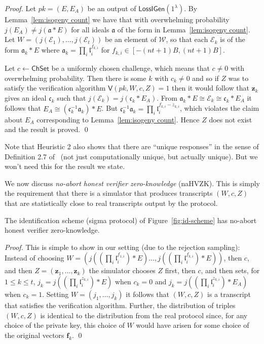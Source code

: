 \documentclass{llncs}
\newcommand{\E}{\mathcal{E}}
\renewcommand{\a}{\mathfrak{a}}
\renewcommand{\c}{\mathfrak{c}}
\renewcommand{\l}{\mathfrak{l}}
\newcommand{\f}{\mathbf{f}}
\newcommand{\z}{\mathbf{z}}
\newcommand{\VV}{\mathsf{V}}
\newcommand{\Wset}{\mathcal{W}}
\newcommand{\ChSet}{\textsf{ChSet}}
\newcommand{\LossIGen}{\mathsf{LossIGen}}
\begin{document}
\begin{proof}
Let $pk = (E, E_A )$ be an output of $\LossIGen( 1^\lambda )$.
By Lemma~\ref{lem:isogeny count} we have that with overwhelming probability $j(E_A) \ne j( \a * E )$ for all ideals $\a$ of the form in Lemma~\ref{lem:isogeny count}.
Let $W = (j(\E_1), \dots, j(\E_t) )$ be an element of $\Wset$, so that each $\E_k$ is of the form $\a_k * E$ where $\a_k = \prod_i \l_i^{f_{k,i}}$ for $f_{k,i} \in [-(nt+1)B, (nt+1)B ]$.


Let $c \leftarrow \ChSet$ be a uniformly chosen challenge, which means that $c \ne 0$ with overwhelming probability.
Then there is some $k$ with $c_k \ne 0$ and so if $Z$ was to satisfy the verification algorithm
$\VV( pk, W, c, Z ) = 1$ then it would follow that $\z_k$ gives an ideal $\c_k$ such that $j(\E_k) = j( \c_k * E_A )$.
From $\a_k * E  \cong \E_k \cong \c_k * E_A$ it follows that $E_A \cong (\c_k^{-1} \a_k ) * E$.
But $\c_k^{-1} \a_k = \prod_i \l_i^{f_{k,i} - z_{k,i}}$, which violates the claim about $E_A$ corresponding to Lemma~\ref{lem:isogeny count}. Hence $Z$ does not exist and the result is proved. \qed
\end{proof}


Note that Heuristic 2 also shows that there are ``unique responses'' in the sense of Definition 2.7 of~\cite{KLS18} (not just computationally unique, but actually unique). But we won't need this for the result we state.


We now discuss \emph{no-abort honest verifier zero-knowledge} (naHVZK).
This is simply the requirement that there is a simulator that produces transcripts $(W,c,Z)$ that are statistically close to real transcripts output by the protocol.


\begin{lemma}
The identification scheme (sigma protocol) of Figure~\ref{fig:id-scheme} has no-abort honest verifier zero-knowledge.
\end{lemma}

\begin{proof}
This is simple to show in our setting (due to the rejection sampling): Instead of choosing $W = ( j( (\prod_i \l_i^{f_{1,i}}) * E) \dots, j( ( \prod_i \l_i^{f_{k,i}}) * E ))$, then $c$, and then $Z = (\z_1, \dots, \z_k)$ the simulator chooses $Z$ first, then $c$, and then sets, for $1 \le k \le t$, $j_k = j( (\prod_i \l_i^{z_{k,i}}) * E )$ when $c_k=0$ and $j_k = j( (\prod_i \l_i^{z_{k,i}} ) * E_A )$ when $c_k = 1$.
Setting $W = (j_1,\dots, j_k)$ it follows that $(W, c, Z )$ is a transcript that satisfies the verification algorithm.
Further, the distribution of triples $(W,c,Z)$ is identical to the distribution from the real protocol since, for any choice of the private key, this choice of $W$ would have arisen for some choice of the original vectors $\f_k$. \qed
\end{proof}
\end{document}
